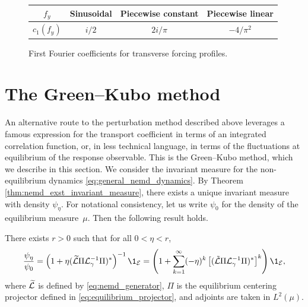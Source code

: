 \begin{figure}
    \begin{center}
        \begin{tabular}{ |c|c|c|c| }\hline
            $f_y$ & Sinusoidal & Piecewise constant & Piecewise linear \\
            \hline
            $c_1(f_y)$ & $i/2$ & $2i/\pi$ & $-4/\pi^2$ \\
            \hline 
        \end{tabular}
        \caption{ \label{tab:fourier_coefficients}
            First Fourier coefficients for transverse forcing profiles.
          }
    \end{center}
\end{figure}

\section{The Green--Kubo method}
An alternative route to the perturbation method described above leverages a famous expression for the transport coefficient in terms of an integrated correlation function, or, in less technical language, in terms of the fluctuations at equilibrium of the response observable.
This is the Green--Kubo method, which we describe in this section. We consider the invariant measure for the non-equilibrium dynamics \eqref{eq:general_nemd_dynamics}. By Theorem \ref{thm:nemd_exst_invariant_measure}, there exists a unique invariant measure with density $\psi_\eta$.
For notational consistency, let us write $\psi_0$ for the density of the equilibrium measure~$\mu$. Then the following result holds. 
\begin{theorem}
    \label{thm:nemd_steady_state_series}
    There exists $r>0$ such that for all $0<\eta<r$,
    \begin{equation}
    \label{eq:nemd_steady_state_series}
        \frac{\psi_\eta}{\psi_0}=\left(1+\eta(\widetilde{\cL} \Pi \cL_\gamma^{-1}\Pi)^*\right)^{-1}\1_{\mathcal E}=\left(1+\sum_{k=1}^{\infty}(-\eta)^k\left[(\tilde \cL \Pi\cL_\gamma^{-1}\Pi)^*\right]^k\right)\1_{\mathcal E},
    \end{equation}
    where $\widetilde{\mathcal{L}}$ is defined by \eqref{eq:nemd_generator}, $\Pi$ is the equilibrium centering projector defined in \eqref{eq:equilibrium_projector}, and adjoints are taken in $L^2(\mu)$.
\end{theorem}
